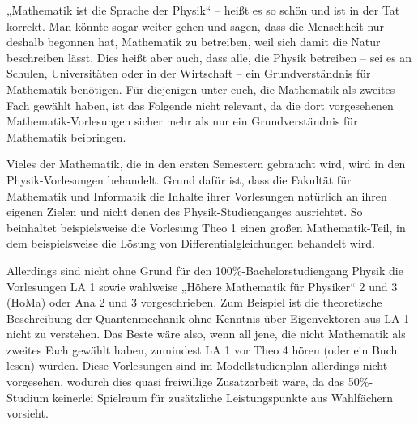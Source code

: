 „Mathematik ist die Sprache der Physik“ -- heißt es so schön und ist in der Tat korrekt. Man könnte sogar weiter gehen und sagen, dass die Menschheit nur deshalb begonnen hat, Mathematik zu betreiben, weil sich damit die Natur beschreiben lässt. Dies heißt aber auch, dass alle, die Physik betreiben -- sei es an Schulen, Universitäten oder in der Wirtschaft -- ein Grundverständnis für Mathematik benötigen. Für diejenigen unter euch, die Mathematik als zweites Fach gewählt haben, ist das Folgende nicht relevant, da die dort vorgesehenen Mathematik-Vorlesungen sicher mehr als nur ein Grundverständnis für Mathematik beibringen. 

Vieles der Mathematik, die in den ersten Semestern gebraucht wird, wird in den Physik-Vorlesungen behandelt. Grund dafür ist, dass die Fakultät für Mathematik und Informatik die Inhalte ihrer Vorlesungen natürlich an ihren eigenen Zielen und nicht denen des Physik-Studienganges ausrichtet. So beinhaltet beispielsweise die Vorlesung Theo 1 einen großen Mathematik-Teil, in dem beispielsweise die Lösung von Differentialgleichungen behandelt wird.

Allerdings sind nicht ohne Grund für den 100\%-Bachelorstudiengang Physik die Vorlesungen LA 1 sowie wahlweise „Höhere Mathematik für Physiker“ 2 und 3 (\gls{HoMa}) oder Ana 2 und 3 vorgeschrieben. Zum Beispiel ist die theoretische Beschreibung der Quantenmechanik ohne Kenntnis über Eigenvektoren aus LA 1 nicht zu verstehen. Das Beste wäre also, wenn all jene, die nicht Mathematik als zweites Fach gewählt haben, zumindest LA 1 vor Theo 4 hören (oder ein Buch lesen) würden. Diese Vorlesungen sind im Modellstudienplan allerdings nicht vorgesehen, wodurch dies quasi freiwillige Zusatzarbeit wäre, da das 50\%-Studium keinerlei Spielraum für zusätzliche Leistungspunkte aus Wahlfächern vorsieht.
